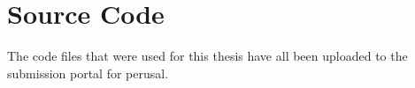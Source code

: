 \documentclass[oneside,12pt]{Latex/Classes/PhDthesisPSnPDF}
\begin{document}
	

% 			

	
 


\appendix
\chapter{Source Code}

The code files that were used for this thesis have all been uploaded to the submission portal for perusal.











\printbibliography[
heading=bibintoc,
title={References}
]







\end{document}
